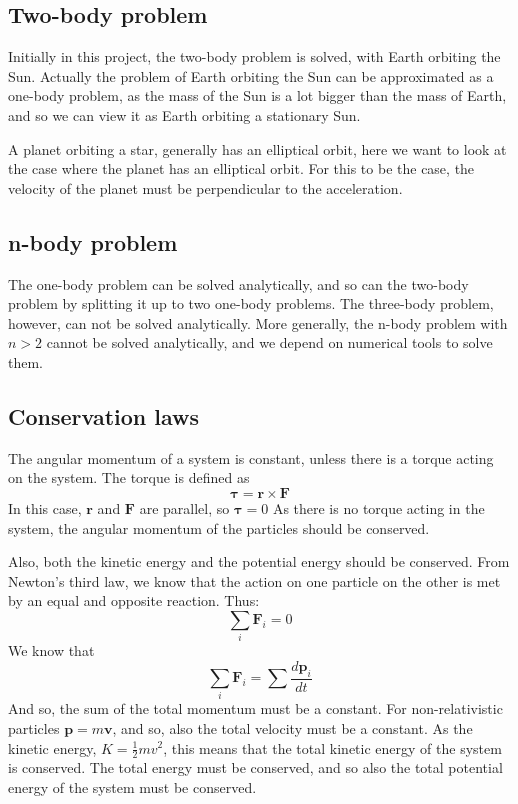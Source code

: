 \subsection{Two-body problem}

Initially in this project, the two-body problem is solved, with Earth orbiting the Sun. Actually the problem of Earth orbiting the Sun can be approximated as a one-body problem, as the mass of the Sun is a lot bigger than the mass of Earth, and so we can view it as Earth orbiting a stationary Sun. 

A planet orbiting a star, generally has an elliptical orbit, here we want to look at the case where the planet has an elliptical orbit. For this to be the case, the velocity of the planet must be perpendicular to the acceleration. 



\subsection{n-body problem}
The one-body problem can be solved analytically, and so can the two-body problem by splitting it up to two one-body problems. The three-body problem, however, can not be solved analytically. More generally, the n-body problem with $n>2$ cannot be solved analytically, and we depend on numerical tools to solve them. 

\subsection{Conservation laws}\label{sec:cons}

The angular momentum of a system is constant, unless there is a torque acting on the system. The torque is defined as 
\begin{equation}
\mathbf{\tau} = \mathbf{r}  \times \mathbf{F}
\end{equation}
In this case, $\mathbf{r}$ and $\mathbf{F}$ are parallel, so $\mathbf{\tau} = 0$
As there is no torque acting in the system, the angular momentum of the particles should be conserved. 

Also, both the kinetic energy and the potential energy should be conserved. 
From Newton's third law, we know that the action on one particle on the other is met by an equal and opposite reaction. Thus:
\begin{equation}
\sum_i \mathbf{F}_i  = 0
\end{equation}
We know that 
\begin{equation}
\sum_i \mathbf{F}_i = \sum\frac{d\mathbf{p}_i}{dt}
\end{equation}
And so, the sum of the total momentum must be a constant. For non-relativistic particles $\mathbf{p}= m\mathbf{v}$, and so, also the total velocity must be a constant. As the kinetic energy, $K = \frac{1}{2}mv^2$, this means that the total kinetic energy of the system is conserved. The total energy must be conserved, and so also the total potential energy of the system must be conserved. 
